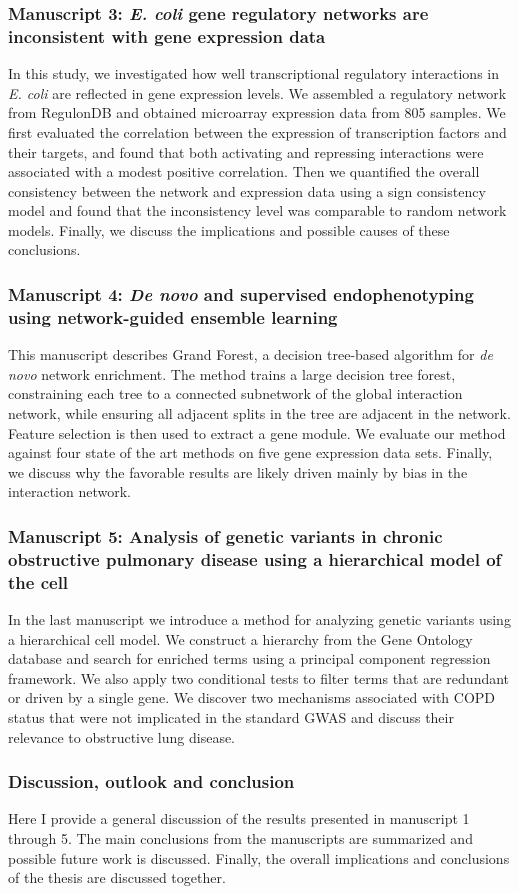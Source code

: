 \subsubsection*{Manuscript 3: \emph{E. coli} gene regulatory networks are inconsistent with gene expression data}
In this study, we investigated how well transcriptional regulatory interactions in \emph{E. coli} are reflected in gene expression levels. We assembled a regulatory network from RegulonDB and obtained microarray expression data from 805 samples. We first evaluated the correlation between the expression of transcription factors and their targets, and found that both activating and repressing interactions were associated with a modest positive correlation. Then we quantified the overall consistency between the network and expression data using a sign consistency model and found that the inconsistency level was comparable to random network models. Finally, we discuss the implications and possible causes of these conclusions.

\subsubsection*{Manuscript 4: \emph{De novo} and supervised endophenotyping using network-guided ensemble learning}
This manuscript describes Grand Forest, a decision tree-based algorithm for \emph{de novo} network enrichment. The method trains a large decision tree forest, constraining each tree to a connected subnetwork of the global interaction network, while ensuring all adjacent splits in the tree are adjacent in the network. Feature selection is then used to extract a gene module. We evaluate our method against four state of the art methods on five gene expression data sets. Finally, we discuss why the favorable results are likely driven mainly by bias in the interaction network.

\subsubsection*{Manuscript 5: Analysis of genetic variants in chronic obstructive pulmonary disease using a hierarchical model of the cell}
In the last manuscript we introduce a method for analyzing genetic variants using a hierarchical cell model. We construct a hierarchy from the Gene Ontology database and search for enriched terms using a principal component regression framework. We also apply two conditional tests to filter terms that are redundant or driven by a single gene. We discover two mechanisms associated with COPD status that were not implicated in the standard GWAS and discuss their relevance to obstructive lung disease.

\subsubsection*{Discussion, outlook and conclusion}
Here I provide a general discussion of the results presented in manuscript 1 through 5. The main conclusions from the manuscripts are summarized and possible future work is discussed. Finally, the overall implications and conclusions of the thesis are discussed together.
